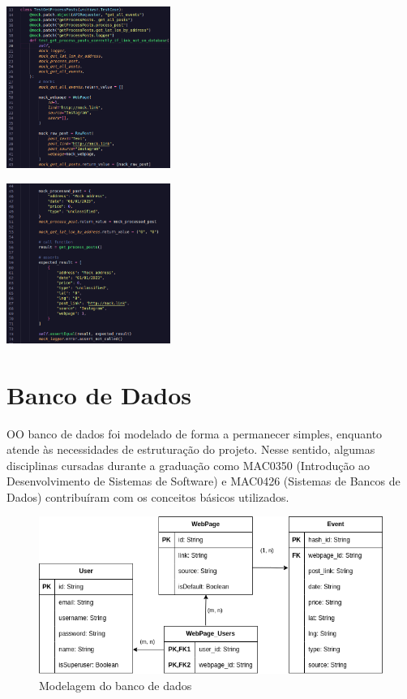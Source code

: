 \begin{multicols}{2}
    \centering
    \vspace*{\fill}
    \includegraphics[width=0.4\textwidth]{figuras/testeUnitario1.png}
    \vspace*{\fill}

    \vspace*{\fill}
    \includegraphics[width=0.4\textwidth]{figuras/testeUnitario2.png}
    \vspace*{\fill}
\end{multicols}

\section{Banco de Dados}

OO banco de dados foi modelado de forma a permanecer simples, enquanto atende
às necessidades de estruturação do projeto. Nesse sentido, algumas disciplinas
cursadas durante a graduação como MAC0350 (Introdução ao Desenvolvimento de
Sistemas de Software) e MAC0426 (Sistemas de Bancos de Dados) contribuíram com
os conceitos básicos utilizados.

\begin{figure}[h]
    \centering
    \includegraphics[width=1\textwidth]{figuras/typesTCCModel.png}
    \caption{Modelagem do banco de dados}
\end{figure}

